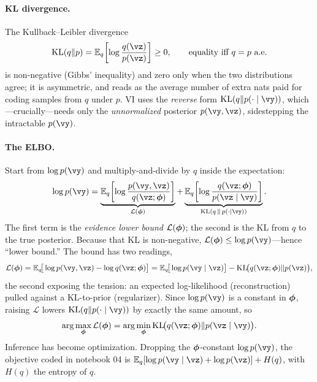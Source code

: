 \documentclass[11pt]{article}
\theoremstyle{plain}
\theoremstyle{definition}
\theoremstyle{remark}
\theoremstyle{definition}
\newcommand{\E}{\mathbb{E}}
\begin{document}
\paragraph{KL divergence.} The Kullback--Leibler divergence
\begin{equation}\label{eq:vi-kl}
    \mathrm{KL}(q \Vert p) = \E_{q}\!\left[\log\frac{q(\vz)}{p(\vz)}\right] \geq 0,
    \qquad \text{equality iff } q = p \text{ a.e.}
\end{equation}
is non-negative (Gibbs' inequality) and zero only when the two distributions
agree; it is asymmetric, and reads as the average number of extra nats paid for
coding samples from $q$ under $p$. VI uses the \emph{reverse} form
$\mathrm{KL}(q \Vert p(\cdot\mid\vy))$, which---crucially---needs only the
\emph{unnormalized} posterior $p(\vy,\vz)$, sidestepping the intractable $p(\vy)$.

\paragraph{The ELBO.} Start from $\log p(\vy)$ and multiply-and-divide by $q$
inside the expectation:
\begin{equation}\label{eq:vi-decomp}
    \log p(\vy) = \underbrace{\E_{q}\!\left[\log\frac{p(\vy,\vz)}{q(\vz;\vphi)}\right]}_{\mathcal{L}(\vphi)}
        + \underbrace{\E_{q}\!\left[\log\frac{q(\vz;\vphi)}{p(\vz\mid\vy)}\right]}_{\mathrm{KL}(q\,\Vert\,p(\cdot\mid\vy))} .
\end{equation}
The first term is the \emph{evidence lower bound} $\mathcal{L}(\bm{\phi})$; the second
is the KL from $q$ to the true posterior. Because that KL is non-negative,
$\mathcal{L}(\vphi) \leq \log p(\vy)$---hence ``lower bound.'' The bound has two
readings,
\begin{equation}\label{eq:vi-elbo}
    \mathcal{L}(\vphi) = \E_{q}\!\big[\log p(\vy,\vz) - \log q(\vz;\vphi)\big]
        = \E_{q}\!\big[\log p(\vy\mid\vz)\big] - \mathrm{KL}\!\big(q(\vz;\vphi)\Vert p(\vz)\big) ,
\end{equation}
the second exposing the tension: an expected log-likelihood (reconstruction) pulled
against a KL-to-prior (regularizer). Since $\log p(\vy)$ is a constant in $\bm{\phi}$,
raising $\mathcal{L}$ lowers $\mathrm{KL}(q \Vert p(\cdot\mid\vy))$ by exactly the
same amount, so
\begin{equation}\label{eq:vi-argmax}
    \arg\max_{\vphi}\mathcal{L}(\vphi) = \arg\min_{\vphi}\mathrm{KL}\!\big(q(\vz;\vphi)\Vert p(\vz\mid\vy)\big) .
\end{equation}
Inference has become optimization. Dropping the $\bm{\phi}$-constant $\log p(\vy)$, the
objective coded in notebook 04 is $\E_q[\log p(\vy\mid\vz) + \log p(\vz)] + H(q)$,
with $H(q)$ the entropy of $q$.
\end{document}
